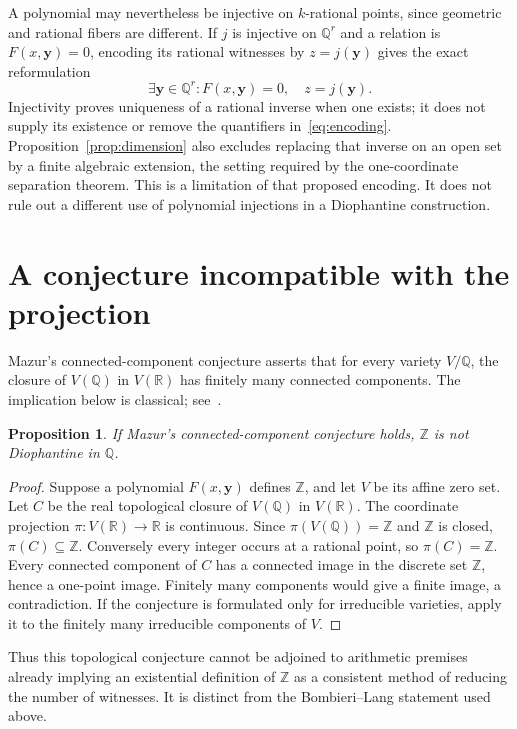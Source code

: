 \documentclass[11pt,a4paper]{article}
\newtheorem{proposition}[theorem]{Proposition}
\theoremstyle{definition}\newtheorem{definition}[theorem]{Definition}
\theoremstyle{remark}\newtheorem{remark}[theorem]{Remark}
\newcommand{\Q}{\mathbb Q}\newcommand{\Z}{\mathbb Z}
\begin{document}
A polynomial may nevertheless be injective on $k$-rational
points, since geometric and rational fibers are different.
If $j$ is injective on $\Q^r$ and a relation is
$F(x,\mathbf y)=0$, encoding its rational witnesses by
$z=j(\mathbf y)$ gives the exact reformulation
\begin{equation}\label{eq:encoding}
 \exists\mathbf y\in\Q^r:
   F(x,\mathbf y)=0,\quad z=j(\mathbf y).
\end{equation}
Injectivity proves uniqueness of a rational inverse when one
exists; it does not supply its existence or remove the
quantifiers in~\eqref{eq:encoding}.
Proposition~\ref{prop:dimension} also excludes replacing that
inverse on an open set by a finite algebraic extension, the
setting required by the one-coordinate separation theorem.
This is a limitation of that proposed encoding. It does not
rule out a different use of polynomial injections in a
Diophantine construction.

\section{A conjecture incompatible with the projection}

Mazur's connected-component conjecture asserts that for every
variety $V/\Q$, the closure of $V(\Q)$ in $V(\mathbb R)$ has
finitely many connected components. The implication below is
classical; see~\cite[\S\S 2--3]{CornelissenZahidi}.

\begin{proposition}\label{prop:mazur}
If Mazur's connected-component conjecture holds, $\Z$ is
not Diophantine in $\Q$.
\end{proposition}
\begin{proof}
Suppose a polynomial $F(x,\mathbf y)$ defines $\Z$, and let
$V$ be its affine zero set. Let $C$ be the real topological
closure of $V(\Q)$ in $V(\mathbb R)$. The coordinate projection
$\pi:V(\mathbb R)\to\mathbb R$ is continuous. Since
$\pi(V(\Q))=\Z$ and $\Z$ is closed,
$\pi(C)\subseteq\Z$. Conversely every integer occurs at a
rational point, so $\pi(C)=\Z$.
Every connected component of $C$ has a connected image in
the discrete set $\Z$, hence a one-point image.
Finitely many components would give a finite image, a
contradiction. If the conjecture is formulated only for
irreducible varieties, apply it to the finitely many
irreducible components of $V$.
\end{proof}

Thus this topological conjecture cannot be adjoined to
arithmetic premises already implying an existential definition
of $\Z$ as a consistent method of reducing the number of witnesses.
It is distinct from the Bombieri--Lang statement used above.
\end{document}
